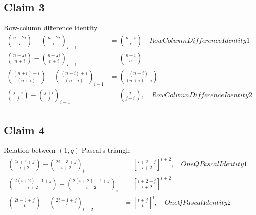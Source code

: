 \documentclass[12pt,letterpaper,oneside,reqno]{amsart}
\newcommand \rascalNumber [3] {\binom{#1}{#2}_{#3}}
\newcommand{\genstirlingI}[3]{%
    \genfrac{[}{]}{0pt}{#1}{#2}{#3}%
}
\newcommand{\oneQBinomial}[3]{\genstirlingI{}{#1}{#2}^{#3}}
\numberwithin{equation}{section}
\begin{document}
\subsection{Claim 3} Row-column difference identity
\begin{align*}
    \binom{n+2i}{i} - \rascalNumber{n+2i}{i}{i-1} &= \binom{n+i}{i} \quad RowColumnDifferenceIdentity1 \\
    \binom{n+2i}{n+i} - \rascalNumber{n+2i}{n+i}{i-1} &= \binom{n+i}{n} \\
    \binom{(n+i)+i}{(n+i)} - \rascalNumber{(n+i)+i}{(n+i)}{i-1} &= \binom{(n+i)}{(n+i)-i} \\
    \binom{j+i}{j} - \rascalNumber{j+i}{j}{i-1} &= \binom{j}{j-i}, \quad RowColumnDifferenceIdentity2 \\
\end{align*}

\subsection{Claim 4} Relation between $(1,q)$-Pascal's triangle
\begin{align*}
    \binom{2i+3+j}{i+2} - \rascalNumber{2i+3+j}{i+2}{i} &= \oneQBinomial{i+2+j}{i+2}{i+2}, \quad OneQPascalIdentity1 \\
    \binom{2(i+2)-1+j}{i+2} - \rascalNumber{2(i+2)-1+j}{i+2}{i} &= \oneQBinomial{i+2+j}{i+2}{i+2} \\
    \binom{2t-1+j}{t} - \rascalNumber{2t-1+j}{t}{t-2} &= \oneQBinomial{t+j}{t}{t}, \quad OneQPascalIdentity2 \\
\end{align*}
\end{document}
